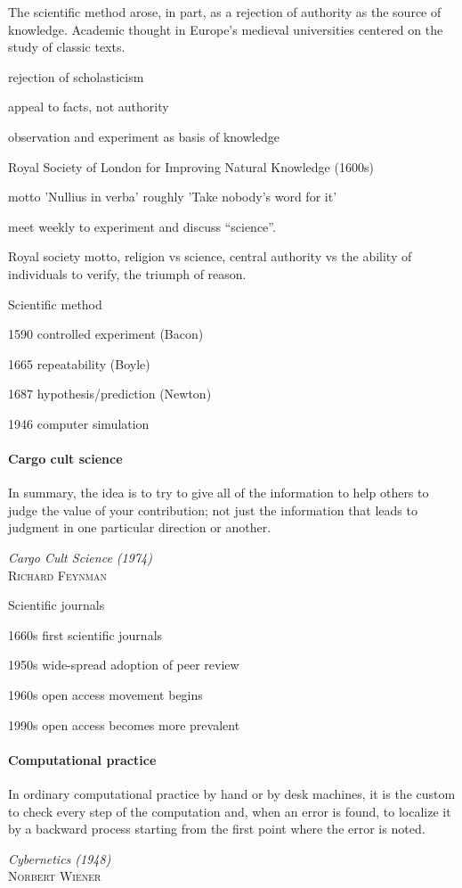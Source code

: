\documentclass[ChapterTOCs,krantz2]{krantz} %
\begin{document}
The scientific method arose, in part, as a rejection of authority as
the source of knowledge. Academic thought in Europe's medieval universities
centered on the study of classic texts.

rejection of scholasticism

appeal to facts, not authority

observation and experiment as basis of knowledge

Royal Society of London for Improving Natural Knowledge (1600s)

motto 'Nullius in verba' roughly 'Take nobody's word for it'

meet weekly to experiment and discuss ``science''. 

Royal society motto, religion vs science, central authority vs the
ability of individuals to verify, the triumph of reason.

Scientific method

1590  controlled experiment (Bacon)

1665  repeatability (Boyle)

1687  hypothesis/prediction (Newton)

1946  computer simulation


\paragraph{ {\bf Cargo cult science}}

\setlength{\epigraphrule}{0pt}
\setlength{\epigraphwidth}{.65\textwidth}
\epigraph%
{%
  In summary, the idea is to try to give all of the information to
  help others to judge the value of your contribution; not just the
  information that leads to judgment in one particular direction or
  another.
}%
{\textit{Cargo Cult Science (1974)}\\ \textsc{Richard Feynman} }

Scientific journals

1660s  first scientific journals

1950s  wide-spread adoption of peer review

1960s  open access movement begins

1990s  open access becomes more prevalent


\paragraph{ {\bf Computational practice}}

\setlength{\epigraphrule}{0pt}
\setlength{\epigraphwidth}{.65\textwidth}
\epigraph%
{%
  In ordinary computational practice by hand or by desk machines, it
  is the custom to check every step of the computation and, when an
  error is found, to localize it by a backward process starting from
  the first point where the error is noted.
}%
{\textit{Cybernetics (1948)}\\ \textsc{Norbert Wiener} }
\end{document}
